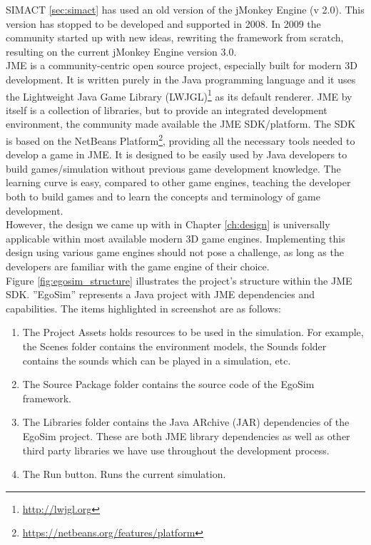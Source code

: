 SIMACT \ref{sec:simact} has used an old version of the jMonkey Engine (v 2.0). This version has stopped to be developed and supported in 2008. In 2009 the community started up with new ideas, rewriting the framework from scratch, resulting on the current jMonkey Engine version 3.0.\\

JME is a community-centric open source project, especially built for modern 3D development. It is written purely in the Java programming language and it uses the Lightweight Java Game Library (LWJGL)\footnote{\url{http://lwjgl.org}} as its default renderer. JME by itself is a collection of libraries, but to provide an integrated development environment, the community made available the JME SDK/platform. The SDK is based on the NetBeans Platform\footnote{\url{https://netbeans.org/features/platform}}, providing all the necessary tools needed to develop a game in JME. It is designed to be easily used by Java developers to build games/simulation without previous game development knowledge. The learning curve is easy, compared to other game engines, teaching the developer both to build games and to learn the concepts and terminology of game development.\\

However, the design we came up with in Chapter \ref{ch:design} is universally applicable within most available modern 3D game engines. Implementing this design using various game engines should not pose a challenge, as long as the developers are familiar with the game engine of their choice.\\

Figure \ref{fig:egosim_structure} illustrates the project's structure within the JME SDK. ''EgoSim'' represents a Java project with JME dependencies and capabilities. The items highlighted in screenshot are as follows:
\begin{enumerate}
	\item The Project Assets holds resources to be used in the simulation. For example, the Scenes folder contains the environment models, the Sounds folder contains the sounds which can be played in a simulation, etc.
	\item The Source Package folder contains the source code of the EgoSim framework.
	\item The Libraries folder contains the Java ARchive (JAR) dependencies of the EgoSim project. These are both JME library dependencies as well as other third party libraries we have use throughout the development process.
	\item The Run button. Runs the current simulation.
\end{enumerate}


